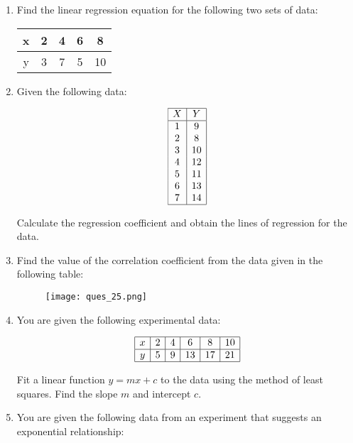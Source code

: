 \documentclass[11pt]{article}
\begin{document}
\begin{enumerate}
\item Find the linear regression equation for the following two sets of data:

\begin{center}
\begin{tabular}{|c|c|c|c|c|}
\hline
x & 2 & 4 & 6 & 8 \\
\hline
y & 3 & 7 & 5 & 10 \\
\hline
\end{tabular}
\end{center}



\item Given the following data:

\[
\begin{array}{|c|c|}
\hline
X & Y \\
\hline
1 & 9 \\
2 & 8 \\
3 & 10 \\
4 & 12 \\
5 & 11 \\
6 & 13 \\
7 & 14 \\
\hline
\end{array}
\]

Calculate the regression coefficient and obtain the lines of regression for the data.




\item Find the value of the correlation coefficient from the data given in the following table:

\begin{figure}[h]
    \centering
    \texttt{[image: ques\_25.png]}
\end{figure}


\item You are given the following experimental data:

\[
\begin{array}{|c|c|c|c|c|c|}
\hline
x & 2 & 4 & 6 & 8 & 10 \\
\hline
y & 5 & 9 & 13 & 17 & 21 \\
\hline
\end{array}
\]

Fit a linear function \( y = mx + c \) to the data using the method of least squares. Find the slope \( m \) and intercept \( c \).

\item
You are given the following data from an experiment that suggests an exponential relationship:


\end{enumerate}
\end{document}
